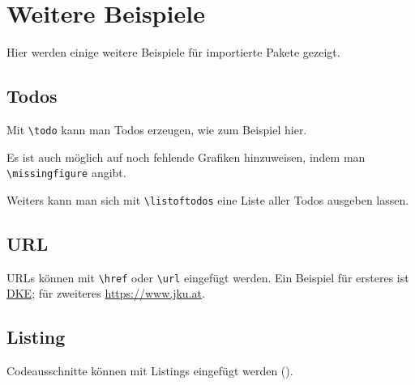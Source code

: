 
\chapter{Weitere Beispiele}

Hier werden einige weitere Beispiele für importierte Pakete gezeigt.

\section{Todos}

Mit \verb|\todo| kann man Todos erzeugen, wie zum Beispiel hier. 

Es ist auch möglich auf noch fehlende Grafiken hinzuweisen, indem man \verb|\missingfigure| angibt.


Weiters kann man sich mit \verb|\listoftodos| eine Liste aller Todos ausgeben lassen.

\section{URL}

URLs können mit \verb|\href| oder \verb|\url| eingefügt werden. Ein Beispiel für ersteres ist \href{http://dke.jku.at}{DKE}; für zweiteres \url{https://www.jku.at}.

\section{Listing}

Codeausschnitte können mit Listings eingefügt werden (\verb||).

